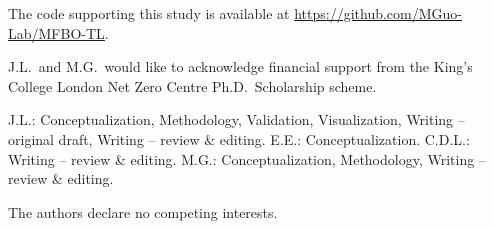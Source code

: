 \documentclass[pdflatex,sn-nature,iicol]{sn-jnl}%
\begin{document}

The code supporting this study is available at
\url{https://github.com/MGuo-Lab/MFBO-TL}.




J.L.\ and M.G.\ would like to acknowledge financial support from the King's
College London Net Zero Centre Ph.D.\ Scholarship scheme.


J.L.: Conceptualization, Methodology, Validation, Visualization,
Writing -- original draft, Writing -- review \& editing.
E.E.: Conceptualization.
C.D.L.: Writing -- review \& editing.
M.G.: Conceptualization, Methodology, Writing -- review \& editing.


The authors declare no competing interests.

\ifdefined\withSI
\onecolumn

\fi
\end{document}
